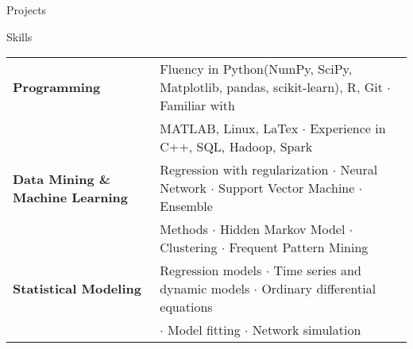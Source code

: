 \documentclass{my_resume} %
\begin{document}
\begin{rSection}{Projects}

\end{rSection}


\begin{rSection}{Skills}

\begin{tabular}{ @{} >{\bfseries}l @{\hspace{6ex}} l }
  Programming & Fluency in Python(NumPy, SciPy, Matplotlib, pandas,
  scikit-learn), R, Git {$\cdot$} Familiar with \\
  & MATLAB, Linux, LaTex {$\cdot$} Experience in C++, SQL, Hadoop, Spark\\
  Data Mining \& Machine Learning & Regression with regularization {$\cdot$}
  Neural Network {$\cdot$} Support Vector Machine {$\cdot$} Ensemble\\
  & Methods {$\cdot$} Hidden Markov Model {$\cdot$} Clustering {$\cdot$} Frequent Pattern Mining\\
  Statistical Modeling & Regression models {$\cdot$} Time series and dynamic
  models {$\cdot$} Ordinary differential equations \\
  & {$\cdot$} Model fitting {$\cdot$} Network simulation\\
\end{tabular}
\end{rSection}

\end{document}
